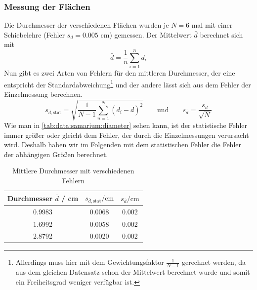 \subsubsection{Messung der Flächen}
Die Durchmesser der verschiedenen Flächen wurden je $N = 6$ mal mit einer Schiebelehre (Fehler $s_d = 0.005$ cm) gemessen. Der Mittelwert $\bar{d}$ berechnet sich mit
\begin{equation}
  \bar{d} = \frac{1}{n} \sum_{i=1}^{n} d_i
\end{equation}
Nun gibt es zwei Arten von Fehlern für den mittleren Durchmesser, der eine entspricht der Standardabweichung\footnote{Allerdings muss hier mit 
dem Gewichtungsfaktor $\frac{1}{N-1}$ gerechnet werden, da aus dem gleichen Datensatz schon der Mittelwert berechnet wurde und somit ein Freiheitsgrad 
weniger verfügbar ist.} 
und der andere lässt sich aus dem Fehler der Einzelmessung berechnen.
\begin{equation}
  s_{\bar{d}, \text{stat}} = \sqrt{\frac{1}{N-1} \sum_{n=1}^{N} \left( d_i - \bar{d} \right)^2} \qquad \text{und} \qquad 
  s_{\bar{d}} = \frac{s_d}{\sqrt{N}} 
\end{equation}
Wie man in \autoref{tab:data:samarium:diameter} sehen kann, ist der statistische Fehler immer größer oder gleicht dem Fehler, der durch die Einzelmessungen 
verursacht wird. Deshalb haben wir im Folgenden mit dem statistischen Fehler die Fehler der abhängigen Größen berechnet.
\begin{table}[H]
\caption{Mittlere Durchmesser mit verschiedenen Fehlern}
\begin{center}
\begin{tabular}{|c|c|c|}
  \hline
  Durchmesser $\bar{d}$ / cm & $s_{\bar{d}, \text{stat}} / \text{cm}$ & $s_{\bar{d}} / \text{cm}$  \\ \hline 
  0.9983 & 0.0068 & 0.002 \\ \hline
  1.6992 & 0.0058 & 0.002 \\ \hline
  2.8792 & 0.0020 & 0.002 \\ \hline
\end{tabular}
\end{center}
\label{tab:data:samarium:diameter}
\end{table}

